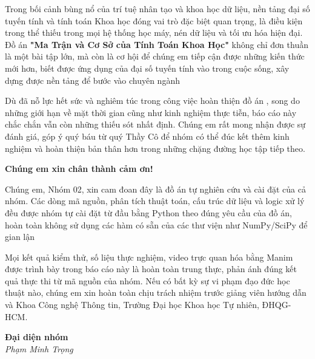 \documentclass[a4paper]{article}
\begin{document}
\tableofcontents
\newpage

Trong bối cảnh bùng nổ của trí tuệ nhân tạo và khoa học dữ liệu, nền tảng đại số tuyến tính và tính toán Khoa học đóng vai trò đặc biệt quan trọng, là điều kiện trong thể thiếu trong mọi hệ thống học máy, nén dữ liệu và tối ưu hóa hiện đại. Đồ án \textbf{"Ma Trận và Cơ Sở của Tính Toán Khoa Học"} không chỉ đơn thuần là một bài tập lớn, mà còn là cơ hội để chúng em tiếp cận được những kiến thức mới hơn, biết được ứng dụng của đại số tuyến tính vào trong cuộc sống, xây dựng được nền tảng để bước vào chuyên ngành

Dù đã nỗ lực hết sức và nghiêm túc trong công việc hoàn thiện đồ án , song do những giới hạn về mặt thời gian cũng như kinh nghiệm thực tiễn, báo cáo này chắc chắn vẫn còn những thiếu sót nhất định. Chúng em rất mong nhận được sự đánh giá, góp ý quý báu từ quý Thầy Cô để nhóm có thể đúc kết thêm kinh nghiệm và hoàn thiện bản thân hơn trong những chặng đường học tập tiếp theo.

\textbf{Chúng em xin chân thành cảm ơn!}
\newpage

Chúng em, Nhóm 02, xin cam đoan đây là đồ án tự nghiên cứu và cài đặt của cả nhóm. Các dòng mã nguồn, phân tích thuật toán, cấu trúc dữ liệu và logic xử lý đều được nhóm tự cài đặt từ đầu bằng Python theo đúng yêu cầu của đồ án, hoàn toàn không sử dụng các hàm có sẵn của các thư viện như NumPy/SciPy để gian lận

Mọi kết quả kiểm thử, số liệu thực nghiệm, video trực quan hóa bằng Manim được trình bày trong báo cáo này là hoàn toàn trung thực, phản ánh đúng kết quả thực thi từ mã nguồn của nhóm. Nếu có bất kỳ sự vi phạm đạo đức học thuật nào, chúng em xin hoàn toàn chịu trách nhiệm trước giảng viên hướng dẫn và Khoa Công nghệ Thông tin, Trường Đại học Khoa học Tự nhiên, ĐHQG-HCM.

\vspace{1cm}
\begin{flushright}
\textbf{Đại diện nhóm} \\
\vspace{1.5cm}
\textit{Phạm Minh Trọng}
\end{flushright}
\newpage
\end{document}
